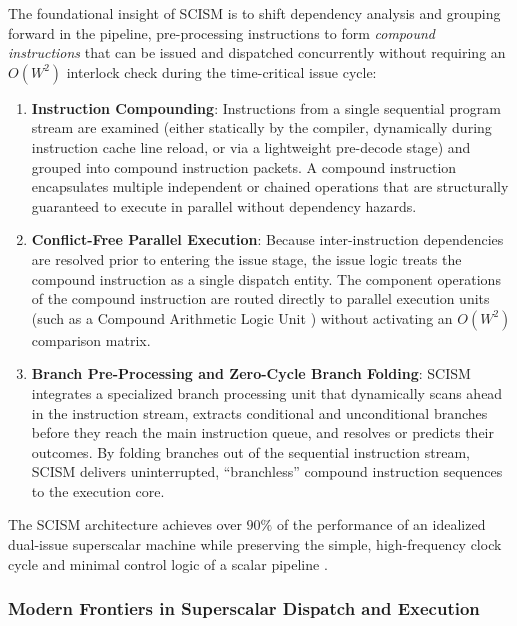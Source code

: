 The foundational insight of SCISM is to shift dependency analysis and grouping forward in the pipeline, pre-processing instructions to form \textit{compound instructions} that can be issued and dispatched concurrently without requiring an $O(W^2)$ interlock check during the time-critical issue cycle:
\begin{enumerate}
    \item \textbf{Instruction Compounding}: Instructions from a single sequential program stream are examined (either statically by the compiler, dynamically during instruction cache line reload, or via a lightweight pre-decode stage) and grouped into compound instruction packets. A compound instruction encapsulates multiple independent or chained operations that are structurally guaranteed to execute in parallel without dependency hazards.
    
    \item \textbf{Conflict-Free Parallel Execution}: Because inter-instruction dependencies are resolved prior to entering the issue stage, the issue logic treats the compound instruction as a single dispatch entity. The component operations of the compound instruction are routed directly to parallel execution units (such as a Compound Arithmetic Logic Unit \cite{vassiliadis1993calu}) without activating an $O(W^2)$ comparison matrix.
    
    \item \textbf{Branch Pre-Processing and Zero-Cycle Branch Folding}: SCISM integrates a specialized branch processing unit that dynamically scans ahead in the instruction stream, extracts conditional and unconditional branches before they reach the main instruction queue, and resolves or predicts their outcomes. By folding branches out of the sequential instruction stream, SCISM delivers uninterrupted, ``branchless'' compound instruction sequences to the execution core.
\end{enumerate}

The SCISM architecture achieves over $90\%$ of the performance of an idealized dual-issue superscalar machine while preserving the simple, high-frequency clock cycle and minimal control logic of a scalar pipeline \cite{vassiliadis1994scism}.


\subsubsection{Modern Frontiers in Superscalar Dispatch and Execution}\label{sec:modern_superscalar_frontiers}

